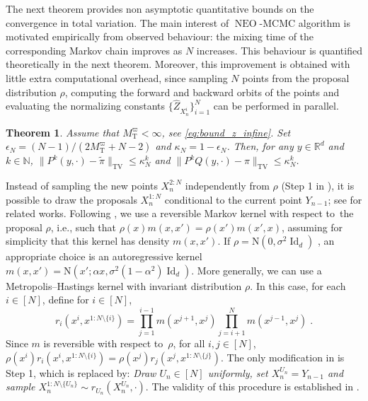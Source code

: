 \documentclass{article}
\newtheorem{theorem}{Theorem}
\def\Normal{\mathrm{N}}
\def\IFIS{\ensuremath{\operatorname{NEO}}}
\def\InFiNE{{\small \IFIS}}
\def\transfo{\operatorname{T}}
\def\Id{\operatorname{Id}}
\def\rset{\mathbb{R}}
\def\nset{\mathbb{N}}
\def\eqsp{\,}
\def\wrt{w.r.t.}
\newcommand{\tvnorm}[1]{\| #1 \|_{\mathrm{TV}}}
\def\eqsp{\;}
\newcommand{\1}{\mathds{1}}
\def\Id{\operatorname{Id}}
\def\Id{\operatorname{Id}}
\def\proposal{\rho}
\newcommand{\chunku}[3]{#1^{#2:#3}}
\newcommand{\chunkum}[4]{#1^{#2:#3 \setminus \{#4\}}}
\newcommand{\estConstC}[1]{\widehat{Z}_{#1}}
\def\tpi{\tilde{\pi}}
\def\rset{\mathbb{R}}
\def\nset{\mathbb{N}}
\def\wrt{with respect to}
\def\bound{M_{\transfo}^{\varpi}}
\begin{document}
The next theorem provides non asymptotic quantitative bounds on the convergence in total variation. The main  interest of \InFiNE-MCMC algorithm is motivated empirically from observed behaviour: the mixing time of the corresponding Markov chain improves as $N$ increases. This behaviour is quantified theoretically in the next theorem. Moreover, this improvement is  obtained with little extra computational overhead, since  sampling $N$ points  from the proposal distribution $\proposal$, computing the forward and backward orbits of the points and evaluating the normalizing constants $\{\estConstC{X_n^i}\}_{i=1}^N$ can be performed in parallel.
\begin{theorem}
\label{theo:geom_ergodicity_infine}
Assume that $\bound<\infty$, see \eqref{eq:bound_z_infine}. Set  $\epsilon_N =  {(N -1)}/{(2\bound + N-2)}$ and $\kappa_N= 1 -\epsilon_N$.
Then, for any $y\in\rset^d$ and $k \in \nset$, $\tvnorm{P^{k}(y, \cdot) - \tpi}\leq \kappa_N^k$ and  $\tvnorm{P^{k}Q(y, \cdot) - \pi}\leq \kappa_N^k$.
\end{theorem}
Instead of sampling the new points $\chunku{X}{2}{N}_n$ independently from $\proposal$ (Step 1 in ), it is possible to draw the proposals $\chunku{X_n}{1}{N}$ conditional to the current point $Y_{n-1}$; see \cite{so2006bayesian,craiu2007acceleration,shestopaloff:neal:2018,ruiz:titsias:doucet:2020} for related works. 
Following \cite{ruiz:titsias:doucet:2020}, we use a reversible Markov kernel  \wrt\ the proposal $\proposal$, i.e., such that $\proposal(x) m(x,x')= \proposal(x') m(x',x)$, assuming for simplicity that this kernel has density $m(x,x')$.  
If $\proposal= \Normal(0, \sigma^2\Id_d)$ , an appropriate choice is an autoregressive kernel $m(x,x')= \Normal(x';\alpha x,  \sigma^2(1-\alpha^2)\Id_d)$. More generally, we can use a Metropolis--Hastings kernel with invariant distribution $\proposal$.
In this case, for each $i \in [N]$, define for $i \in [N]$, 
\begin{equation}
\label{eq:defintion-r-i}
r_i(x^i,\chunkum{x}{1}{N}{i}) =
 \prod_{j=1}^{i-1} m(x^{j+1},x^j)\prod_{j=i+1}^N m(x^{j-1},x^j)\eqsp.
\end{equation}
Since $m$ is reversible \wrt\ $\proposal$,   for all $i,j\in[N]$, $\proposal(x^i) r_i(x^i,\chunkum{x}{1}{N}{i}) = \proposal(x^j) r_j(x^j,\chunkum{x}{1}{N}{j})$. The only modification in  is Step 1, which is replaced by:  \emph{Draw $U_n \in[N]$ uniformly, set $X_{n}^{U_n}= Y_{n-1}$ and sample $\chunkum{X_{n}}{1}{N}{U_n} \sim r_{U_n}(X^{U_n}_n,\cdot)$}.
The validity of this procedure is established in .
\end{document}
